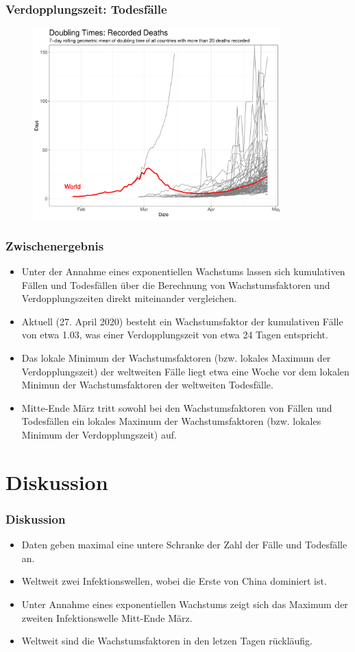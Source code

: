 \documentclass{beamer}
\begin{document}
\begin{frame}
	\frametitle{Verdopplungszeit: Todesfälle}
	\begin{figure}
		\centering
		\includegraphics[width = 270pt]{DT_deaths}
	\end{figure}
\end{frame}

 \begin{frame}
 	\frametitle{Zwischenergebnis}
 	\begin{itemize}
 		\item Unter der Annahme eines exponentiellen Wachstums lassen sich kumulativen Fällen und Todesfällen über die Berechnung von Wachstumsfaktoren und Verdopplungszeiten direkt miteinander vergleichen. 
 		\item Aktuell (27. April 2020) besteht ein Wachstumsfaktor der kumulativen Fälle von etwa 1.03, was einer Verdopplungszeit von etwa 24 Tagen entspricht.
 		\item Das lokale Minimum der Wachstumsfaktoren (bzw. lokales Maximum der Verdopplungszeit) der weltweiten Fälle liegt etwa eine Woche vor dem lokalen Minimun der Wachstumsfaktoren der weltweiten Todesfälle.
 		\item Mitte-Ende März tritt sowohl bei den Wachstumsfaktoren von Fällen und Todesfällen ein lokales Maximum der Wachstumsfaktoren (bzw. lokales Minimum der Verdopplungszeit) auf.
 	\end{itemize}
 \end{frame}

\section{Diskussion}
\begin{frame}
	\frametitle{Diskussion}
	\begin{itemize}
		\item Daten geben maximal eine untere Schranke der Zahl der Fälle und Todesfälle an.
		\item Weltweit zwei Infektionswellen, wobei die Erste von China dominiert ist.
		\item Unter Annahme eines exponentiellen Wachstums zeigt sich das Maximum der zweiten Infektionswelle Mitt-Ende März.
		\item Weltweit sind die Wachstumsfaktoren in den letzen Tagen rückläufig.
	\end{itemize}
\end{frame}
\end{document}
